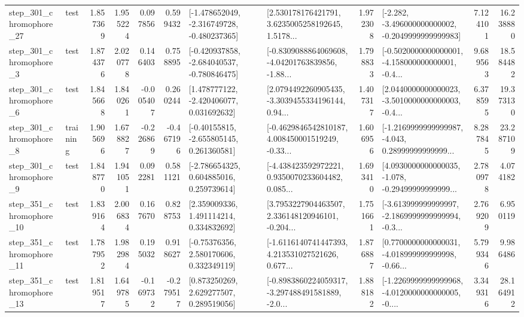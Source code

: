 \begin{tabular}{llrrrrllrlrr}
  step\_301\_chromophore\_27 &      test &      1.857369 &    1.955224 &      0.097856 &  0.599432 &  [-1.478652049, -2.316749728, -0.480237365] &  [2.530178176421791, 3.6235005258192645, 1.5178... &       1.972308 &  [-2.282, -3.496000000000002, -0.2049999999999983] &            7.124101 &         16.238880 \\
   step\_301\_chromophore\_3 &      test &      1.874376 &    2.020778 &      0.146403 &  0.758895 &  [-0.420937858, -2.684040537, -0.780846475] &  [-0.8309088864069608, -4.04201763839856, -1.88... &       1.798833 &  [-0.5020000000000001, -4.158000000000001, -0.4... &            9.689563 &         18.584482 \\
   step\_301\_chromophore\_6 &      test &      1.845668 &    1.840261 &     -0.005407 &  0.260244 &    [1.478777122, -2.420406077, 0.031692632] &  [2.0794492260905435, -3.3039455334196144, 0.94... &       1.407317 &  [2.0440000000000023, -3.5010000000000003, -0.4... &            6.378595 &         19.373130 \\
   step\_301\_chromophore\_8 &  training &      1.905696 &    1.678827 &     -0.226869 & -0.467196 &    [-0.40155815, -2.655805145, 0.261360581] &  [-0.4629846542810187, 4.008450001519249, -0.33... &       1.606956 &  [-1.2169999999999987, -4.043, 0.28999999999999... &            8.287845 &         23.287109 \\
   step\_301\_chromophore\_9 &      test &      1.848770 &    1.941051 &      0.092281 &  0.581121 &    [-2.786654325, 0.604885016, 0.259739614] &  [-4.438423592972221, 0.9350070233604482, 0.085... &       1.693410 &  [4.0930000000000035, -1.078, -0.29499999999999... &            2.780978 &          4.074182 \\
  step\_351\_chromophore\_10 &      test &      1.839164 &    2.006834 &      0.167670 &  0.828753 &     [2.359009336, 1.491114214, 0.334832692] &  [3.7953227904463507, 2.336148120946101, -0.204... &       1.751661 &  [-3.613999999999997, -2.1869999999999994, -0.3... &            2.769209 &          6.950119 \\
  step\_351\_chromophore\_11 &      test &      1.787952 &    1.982984 &      0.195032 &  0.918627 &     [-0.75376356, 2.580170606, 0.332349119] &  [-1.6116140741447393, 4.213531027521626, 0.677... &       1.876887 &  [0.7700000000000031, -4.018999999999998, -0.66... &            5.799346 &          9.986486 \\
  step\_351\_chromophore\_13 &      test &      1.819517 &    1.649785 &     -0.169732 & -0.279517 &     [0.873250269, 2.629277507, 0.289519056] &  [-0.8983860224059317, -3.297488491581889, -2.0... &       1.888182 &  [-1.2269999999999968, -4.0120000000000005, -0.... &            3.349316 &         28.164912 \\

\end{tabular}
